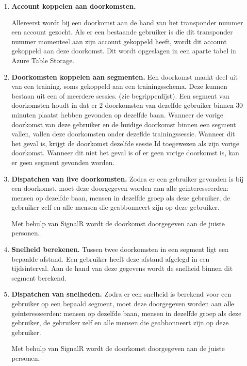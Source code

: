 \begin{enumerate}

\item \textbf{Account koppelen aan doorkomsten.}

Allereerst wordt bij een doorkomst aan de hand van het transponder nummer een account gezocht. Als er een bestaande gebruiker is die dit transponder nummer momenteel aan zijn account gekoppeld heeft, wordt dit account gekoppeld aan deze doorkomst. Dit wordt opgeslagen in een aparte tabel in Azure Table Storage.

\item \textbf{Doorkomsten koppelen aan segmenten.}
Een doorkomst maakt deel uit van een training, soms gekoppeld aan een trainingsschema. Deze kunnen bestaan uit een of meerdere sessies. (zie begrippenlijst). Een segment van doorkomsten houdt in dat er 2 doorkomsten van dezelfde gebruiker binnen 30 minuten plaatst hebben gevonden op dezelfde baan. Wanneer de vorige doorkomst van deze gebruiker en de huidige doorkomst binnen een segment vallen, vallen deze doorkomsten onder dezeflde trainingssessie. Wanneer dit het geval is, krijgt de doorkomst dezelfde sessie Id toegewezen als zijn vorige doorkomst. Wanneer dit niet het geval is of er geen vorige doorkomst is, kan er geen segment gevonden worden.

\item \textbf{Dispatchen van live doorkomsten.}
Zodra er een gebruiker gevonden is bij een doorkomst, moet deze doorgegeven worden aan alle geinteresseerden: mensen op dezelfde baan, mensen in dezelfde groep als deze gebruiker, de gebruiker zelf en alle mensen die geabbonneert zijn op deze gebruiker.

Met behulp van SignalR wordt de doorkomst doorgegeven aan de juiste personen.

\item \textbf{Snelheid berekenen.}
Tussen twee doorkomsten in een segment ligt een bepaalde afstand. Een gebruiker heeft deze afstand afgelegd in een tijdsinterval. Aan de hand van deze gegevens wordt de snelheid binnen dit segment berekend.

\item \textbf{Dispatchen van snelheden.}
Zodra er een snelheid is berekend voor een gebruiker op een bepaald segment, moet deze doorgegeven worden aan alle geïnteresseerden: mensen op dezelfde baan, mensen in dezelfde groep als deze gebruiker, de gebruiker zelf en alle mensen die geabbonneert zijn op deze gebruiker.

Met behulp van SignalR wordt de doorkomst doorgegeven aan de juiste personen.


\end{enumerate}
